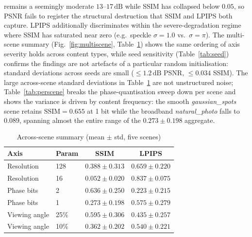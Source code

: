 \documentclass[conference]{IEEEtran}
\begin{document}
remains a seemingly moderate $13$--$17\,\text{dB}$ while SSIM has collapsed below
$0.05$, so PSNR fails to register the structural destruction that SSIM and LPIPS
both capture. LPIPS additionally discriminates within the severe-degradation
regime where SSIM has saturated near zero (e.g.\ speckle $\sigma=1.0$ vs.\
$\sigma=\pi$). The multi-scene summary (Fig.~\ref{fig:multiscene},
Table~\ref{tab:multiscene}) shows the same ordering of axis severity holds across
content types, while seed sensitivity (Table~\ref{tab:seed}) confirms the
findings are not artefacts of a particular random initialisation: standard
deviations across seeds are small ($\le 1.2\,\text{dB}$ PSNR, $\le 0.034$ SSIM).
The large across-scene standard deviations in Table~\ref{tab:multiscene} are not
unstructured noise; Table~\ref{tab:perscene} breaks the phase-quantisation sweep
down per scene and shows the variance is driven by content frequency: the
smooth \textit{gaussian\_spots} scene retains $\text{SSIM}=0.655$ at 1 bit while
the broadband \textit{natural\_photo} falls to $0.089$, spanning almost the
entire range of the $0.273 \pm 0.198$ aggregate.

\begin{table}[t]
  \centering
  \caption{Across-scene summary (mean $\pm$ std, five scenes)}
  \label{tab:multiscene}
  \begin{tabular}{llcc}
    \toprule
    Axis & Param & SSIM & LPIPS \\
    \midrule
    Resolution    & 128 & $0.388 \pm 0.313$ & $0.659 \pm 0.220$ \\
    Resolution    & 16  & $0.052 \pm 0.020$ & $0.837 \pm 0.075$ \\
    Phase bits    & 2   & $0.636 \pm 0.250$ & $0.223 \pm 0.215$ \\
    Phase bits    & 1   & $0.273 \pm 0.198$ & $0.575 \pm 0.279$ \\
    Viewing angle & 25\% & $0.595 \pm 0.306$ & $0.435 \pm 0.257$ \\
    Viewing angle & 10\% & $0.362 \pm 0.202$ & $0.540 \pm 0.221$ \\
    \bottomrule
  \end{tabular}
\end{table}
\end{document}
